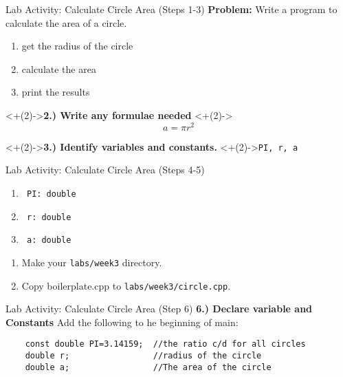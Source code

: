 \documentclass[]{beamer}
\begin{document}
\begin{frame}{Lab Activity: Calculate Circle Area (Steps 1-3)}
    \textbf{Problem:} Write a program to calculate the area of
    a circle.

    \begin{enumerate}[<+(2)->]
        \item get the radius of the circle
        \item calculate the area
        \item print the results
    \end{enumerate}

    \uncover<+(2)->{\textbf{2.) Write any formulae needed}}
    \uncover<+(2)->{
    \[
        a = \pi r^2
    \]}

    \uncover<+(2)->{\textbf{3.) Identify variables and constants.}}
    \uncover<+(2)->{\newline \texttt{PI, r, a}}

\end{frame}


\begin{frame}[fragile]{Lab Activity: Calculate Circle Area (Steps 4-5)}
    \begin{enumerate}[<+->]
        \item \texttt{ PI: double}
        \item \texttt{ r: double}
        \item \texttt{ a: double}
    \end{enumerate}

    \begin{enumerate}[<+->]
        \item Make your \texttt{labs/week3} directory.
        \item Copy boilerplate.cpp to \texttt{labs/week3/circle.cpp}.
    \end{enumerate}
\end{frame}


\begin{frame}[fragile]{Lab Activity: Calculate Circle Area (Step 6)}
    \textbf{6.) Declare variable and Constants}
    \newline Add the following to he beginning of main:
    \newline
        
    \begin{adjustbox}{max width=0.95\textwidth}
    \begin{BVerbatim}
    const double PI=3.14159;  //the ratio c/d for all circles
    double r;                 //radius of the circle
    double a;                 //The area of the circle
    \end{BVerbatim}
    \end{adjustbox}
\end{frame}
\end{document}
